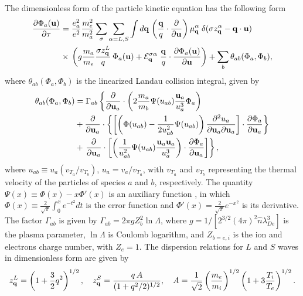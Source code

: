 \documentclass[12pt,a4paper,ruledheader]{report}
\def\calE{{\cal E}}
\begin{document}
The dimensionless form of the particle kinetic equation has the
following form
\begin{equation}
  \begin{split}
    \frac{\partial \Phi_a({\bf u})}{\partial \tau}
    &= \frac{e_a^2}{e^2}\frac{m_e^2}{m_a^2}
    \sum_\sigma\sum_{\alpha=L,S}\int d{\bf q}\;\biggl(\frac{\bf q}{q}
    \cdot\frac{\partial}{\partial{\bf u}}\biggr)\,\mu_{\bf q}^\alpha
    \;\delta(\sigma z_{\bf q}^\alpha-{\bf q}\cdot{\bf u})\\
    & \times\,\biggl(g\frac{m_a}{m_e}\frac{\sigma z_{\bf q}^L}{q}
    \,\Phi_a({\bf u})+\calE_{\bf q}^{\sigma\alpha}
    \;\frac{\bf q}{q}\cdot\frac{\partial \Phi_a({\bf u})}
    {\partial{\bf u}}\biggr)+\sum_b\theta_{ab}(\Phi_a,\Phi_b),
    \label{Feu-evol}
  \end{split}
\end{equation}
where $\theta_{ab}(\Phi_a,\Phi_b)$ is the linearized Landau
collision integral, given by
\begin{equation}
  \begin{split}
     \theta_{ab}(\Phi_a,\Phi_b) &= \Gamma_{ab}\left\{
     \frac{\partial}{\partial{\bf u}_a}\cdot
     \left(2\frac{m_a}{m_b}\Psi(u_{ab})
     \frac{{\bf u}_a}{u^3_a}\Phi_a\right)\right.\\
  &+\frac{\partial}{\partial{\bf u}_a}\cdot
     \left\{\left[\left(\Phi(u_{ab})
     -\frac{1}{2 u_{ab}^2}\Psi(u_{ab})\right)
     \frac{\partial^2u_a}{\partial{\bf u}_a
     \partial{\bf u}_a}\right]\cdot
     \frac{\partial \Phi_a}{\partial{\bf u}_a}\right\}
    \label{eq:coll-lin} \\
  &+\left. \frac{\partial}{\partial{\bf u}_a}\cdot
     \left[\left(\frac{1}{u_{ab}^2}\Psi(u_{ab})
     \frac{{\bf u}_a{\bf u}_a}{u_a^3}\right)\cdot
   \frac{\partial \Phi_a}{\partial{\bf u}_a}\right]\right\},
\end{split}
\end{equation}
where $u_{ab}\equiv u_a (v_{T_a}/v_{T_b})$, $u_a=v_a/v_{T_a}$,
with $v_{T_a}$ and $v_{T_b}$ representing the thermal velocity of
the particles of species $a$ and $b$, respectively. The quantity
$\Psi(x)\equiv\Phi(x)-x\Phi'(x)$ is an auxiliary function \cite{
  Gaffey1976}, in which $\Phi(x) \equiv \frac{2}{\sqrt{\pi}}
\int_0^x e^{-t^2}dt$ is the error function and $\Phi'(x)=
\frac{2}{\sqrt{\pi}}e^{-x^2}$ is its derivative. The factor
$\Gamma_{ab}$ is given by $\Gamma_{ab}=2\pi g Z_b^2 \ln\Lambda $,
where $g=1/[2^{3/2}(4\pi)^2\hat n \lambda_{De}^3]$ is the plasma
parameter, $\ln \Lambda$ is Coulomb logarithm, and $Z_{b=e,i}$ is
the ion and electrons charge number, with $Z_e=1$.
The dispersion relations for $L$ and $S$ waves in dimensionless
form are given by
\begin{eqnarray*}
  z_{\bf q}^L = \left(1+\frac{3}{2}q^2\right)^{1/2},
 \quad   z_{\bf q}^S = \frac{q\, A}{(1+q^2/2)^{1/2}}, \quad
    A= \frac{1}{\sqrt{2}} \left(\frac{m_e}{m_i}\right)^{1/2}
     \left(1+3\frac{T_i}{T_e}\right)^{1/2}.
\end{eqnarray*}
\end{document}
